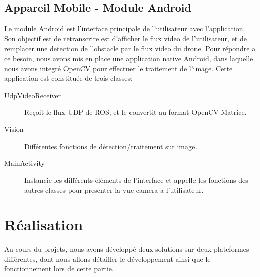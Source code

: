 \documentclass{article}
\begin{document}
\subsection{Appareil Mobile - Module Android}
Le module Android est l'interface principale de l'utilisateur avec
l'application. Son objectif est de retranscrire est d'afficher le flux video de
l'utilisateur, et de remplacer une detection de l'obstacle par le flux video du
drone.
Pour r\'epondre a ce besoin, nous avons mis en place une application native Android\cite{seethroughvisualizer}, dans laquelle nous avons integr\'e OpenCV pour effectuer le traitement de l'image.
Cette application est constitu\'ee de trois classes:
\begin{description}
    \item[UdpVideoReceiver] Re\c coit le flux UDP de ROS, et le convertit au format OpenCV Matrice.
    \item[Vision]Diff\'erentes fonctions de d\'etection/traitement sur image.
    \item[MainActivity] Instancie les diff\'erents \'el\'ements de l'interface 
    et appelle les fonctions des autres classes pour presenter la vue camera a l'utilisateur.
\end{description}

\section{Réalisation}
Au cours du projets, nous avons d\'evelopp\'e deux solutions sur deux plateformes diff\'erentes, dont nous allons d\'etailler le d\'eveloppement ainsi que le fonctionnement lors de cette partie.
\end{document}
